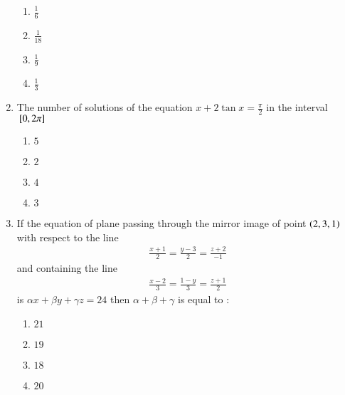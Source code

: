\documentclass[journal,12pt,onecolumn]{IEEEtran}
\theoremstyle{remark}
\begin{document}
\begin{enumerate}
    \begin{multicols}{2}
        \begin{enumerate}
            \item $\frac{1}{6}$\\
            \item $\frac{1}{18}$
            \item $\frac{1}{9}$\\
            \item $\frac{1}{3}$
        \end{enumerate}
    \end{multicols}

    \item The number of solutions of the equation $x + 2\tan{x} = \frac{\pi}{2}$ in the interval ${}\left[0 , 2\pi\right]$
    \begin{multicols}{2}
        \begin{enumerate}
            \item $5$
            \item $2$\\
            \item $4$
            \item $3$
        \end{enumerate}
    \end{multicols}

    \item If the equation of plane passing through the mirror image of point $\left(2 , 3  , 1\right)$ with respect to the line
    \begin{align}
        \frac{x+1}{2} = \frac{y-3}{2} = \frac{z+2}{-1}
    \end{align}
    and containing the line
    \begin{align}\frac{x-2}{3} = \frac{1-y}{3} = \frac{z+1}{2} \end{align}is $\alpha{x}+\beta{y}+\gamma{z} = 24$ then $\alpha + \beta + \gamma$ is equal to : 
    \begin{multicols}{2}
        \begin{enumerate}
            \item $21$
            \item $19$\\
            \item $18$
            \item $20$
        \end{enumerate}
    \end{multicols}


\end{enumerate}
\end{document}
